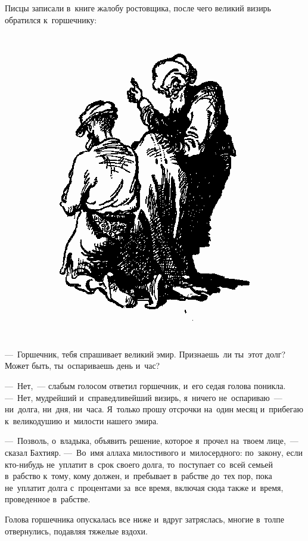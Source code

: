 \documentclass[12pt,a4paper]{book}
\begin{document}
Писцы записали в~книге жалобу ростовщика, после чего великий визирь обратился к~горшечнику:

\begin{figure}[h]
\centering
\includegraphics[scale=0.75]{7.png}
\end{figure}

—~Горшечник, тебя спрашивает великий эмир. Признаешь~ли ты~этот долг? Может быть, ты~оспариваешь день и~час?

—~Нет,~— слабым голосом ответил горшечник, и~его седая голова поникла. —~Нет, мудрейший и~справедливейший визирь, я~ничего не~оспариваю~— ни~долга, ни~дня, ни~часа. Я~только прошу отсрочки на~один месяц и~прибегаю к~великодушию и~милости нашего эмира.

—~Позволь, о~владыка, объявить решение, которое я~прочел на~твоем лице,~— сказал Бахтияр. —~Во~имя аллаха милостивого и~милосердного: по~закону, если кто-нибудь не~уплатит в~срок своего долга, то~поступает со~всей семьей в~рабство к~тому, кому должен, и~пребывает в~рабстве до~тех пор, пока не~уплатит долга с~процентами за~все время, включая сюда также и~время, проведенное в~рабстве.

Голова горшечника опускалась все ниже и~вдруг затряслась, многие в~толпе отвернулись, подавляя тяжелые вздохи.
\end{document}
